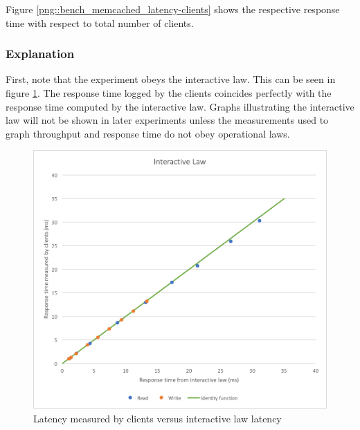 \documentclass[11pt,a4paper]{article}
\begin{document}
Figure \ref{png::bench_memcached_latency-clients} shows the respective response time with respect to total number of clients.



\subsubsection{Explanation\label{section::computation_reads}}
First, note that the experiment obeys the interactive law. This can be seen in figure \ref{png::bench_memcached_inter_law}. The response time logged by the clients coincides perfectly with the response time computed by the interactive law. Graphs illustrating the interactive law will not be shown in later experiments unless the measurements used to graph throughput and response time do not obey operational laws.
\begin{figure}[!h]
    \centering
    \begin{minipage}[b]{.45\textwidth}
        \centering
        \includegraphics[width=\textwidth]{processing/graphics/bench_memcached_inter_law.png}
        \caption{Latency measured by clients versus interactive law latency}
        \label{png::bench_memcached_inter_law}
    \end{minipage}
    \qquad
    \begin{minipage}[b]{.45\textwidth}
        \centering

\end{minipage}
\end{figure}
\end{document}
